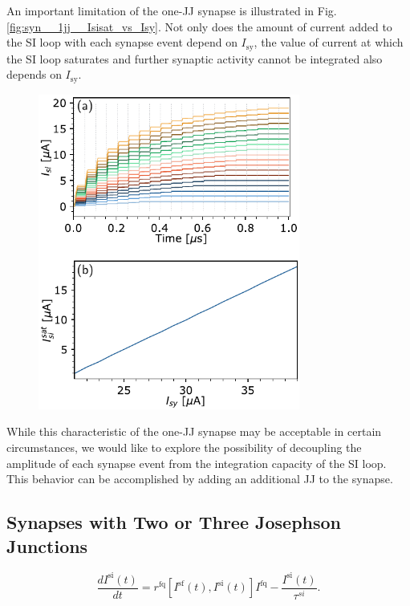 \documentclass[twocolumn]{article}
\begin{document}
An important limitation of the one-JJ synapse is illustrated in Fig.\,\ref{fig:syn__1jj__Isisat_vs_Isy}. Not only does the amount of current added to the SI loop with each synapse event depend on $I_{\mathrm{sy}}$, the value of current at which the SI loop saturates and further synaptic activity cannot be integrated also depends on $I_{\mathrm{sy}}$.  
\begin{figure}[htb]
\includegraphics[width=8.6cm]{figures/_05__syn__1jj__Isisat_vs_Isy.pdf}
\end{figure}
While this characteristic of the one-JJ synapse may be acceptable in certain circumstances, we would like to explore the possibility of decoupling the amplitude of each synapse event from the integration capacity of the SI loop. This behavior can be accomplished by adding an additional JJ to the synapse.

\subsection{Synapses with Two or Three Josephson Junctions}
\begin{equation}
\label{eq:leaky_integrator__SI_loop}
\frac{dI^{\mathrm{si}}(t)}{dt} = r^{\mathrm{fq}}\left[I^{\mathrm{sf}}(t),I^{\mathrm{si}}(t)\right] I^{\mathrm{fq}}-\frac{I^{\mathrm{si}}(t)}{\tau^{si}}.
\end{equation}
\end{document}
